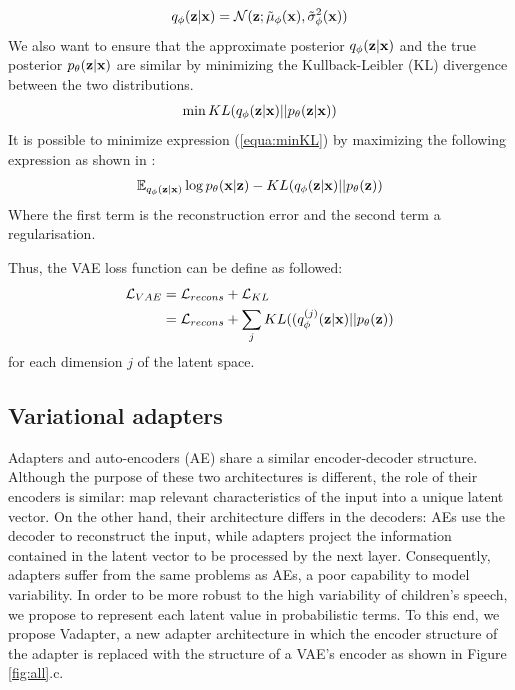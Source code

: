 \begin{equation}
    q_{\phi}(\vb{z}|\vb{x})= \mathcal{N}(\vb{z}; \Tilde{\mu}_{\phi}(\vb{x}), \Tilde{\sigma}^2_{\phi}(\vb{x}))
\end{equation}
 We also want to ensure that the approximate posterior $q_{\phi}(\vb{z}|\vb{x})$ and the true posterior $ p_{\theta}(\vb{z}|\vb{x})$ are similar by minimizing the Kullback-Leibler (KL) divergence between the two distributions. 
\begin{equation} \label{equa:minKL}
     \min KL(q_{\phi}(\vb{z}|\vb{x})|| p_{\theta}(\vb{z}| \vb{x}))
\end{equation}
It is possible to minimize expression (\ref{equa:minKL}) by maximizing the following expression as shown in \cite{vae_transformation}:
\begin{equation}
    \mathbb{E}_{q_{\phi}(\vb{z}| \vb{x})} \log p_{\theta}(\vb{x}|\vb{z}) - KL(q_{\phi}(\vb{z}|\vb{x})|| p_{\theta}(\vb{z}))
\end{equation}
Where the first term is the reconstruction error and the second term a regularisation. %

Thus, the VAE loss function can be define as followed:
\begin{align}
\mathcal{L}_{VAE} & = \mathcal{L}_{recons}+ \mathcal{L}_{KL} \\
                  & = \mathcal{L}_{recons}+ \sum_j KL((q_{\phi}^{(j)}(\vb{z}|\vb{x})|| p_{\theta}(\vb{z}))
\end{align}
for each dimension $j$ of the latent space. 

\subsection{Variational adapters}
\label{Vadapters}
Adapters and auto-encoders (AE) share a similar encoder-decoder structure. Although the purpose of these two architectures is different, the role of their encoders is similar: map relevant characteristics of the input into a unique latent vector. On the other hand, their architecture differs in the decoders: AEs use the decoder to reconstruct the input, while adapters project the information contained in the latent vector to be processed by the next layer. Consequently, adapters suffer from the same problems as AEs, a poor capability to model variability.
In order to be more robust to the high variability of children's speech, we propose to represent each latent value in probabilistic terms. To this end, we propose Vadapter, a new adapter architecture in which the encoder structure of the adapter is replaced with the structure of a VAE's encoder as shown in Figure \ref{fig:all}.c.    

